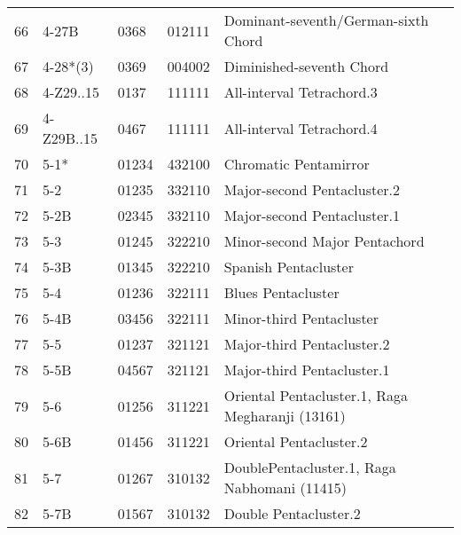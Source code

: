 \begin{table}[h]
\begin{tabular}{lllll}
66 & 4-27B                          & 0368  & 012111          & Dominant-seventh/German-sixth Chord               \\
67 & 4-28*(3)                       & 0369  & 004002          & Diminished-seventh Chord                          \\
68 & 4-Z29..15                      & 0137  & 111111          & All-interval Tetrachord.3                         \\
69 & 4-Z29B..15                     & 0467  & 111111          & All-interval Tetrachord.4                         \\
70 & 5-1*                           & 01234 & 432100          & Chromatic Pentamirror                             \\
71 & 5-2                            & 01235 & 332110          & Major-second Pentacluster.2                       \\
72 & 5-2B                           & 02345 & 332110          & Major-second Pentacluster.1                       \\
73 & 5-3                            & 01245 & 322210          & Minor-second Major Pentachord                     \\
74 & 5-3B                           & 01345 & 322210          & Spanish Pentacluster                              \\
75 & 5-4                            & 01236 & 322111          & Blues Pentacluster                                \\
76 & 5-4B                           & 03456 & 322111          & Minor-third Pentacluster                          \\
77 & 5-5                            & 01237 & 321121          & Major-third Pentacluster.2                        \\
78 & 5-5B                           & 04567 & 321121          & Major-third Pentacluster.1                        \\
79 & 5-6                            & 01256 & 311221          & Oriental Pentacluster.1, Raga Megharanji (13161)  \\
80 & 5-6B                           & 01456 & 311221          & Oriental Pentacluster.2                           \\
81 & 5-7                            & 01267 & 310132          & DoublePentacluster.1, Raga Nabhomani (11415)      \\
82 & 5-7B                           & 01567 & 310132          & Double Pentacluster.2                             \\

\end{tabular}
\end{table}
